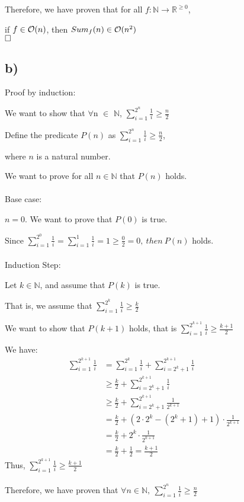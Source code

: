 \documentclass[12pt]{article}
\begin{document}
Therefore, we have proven that for all $f: \mathbb{N} \rightarrow \mathbb{R}^{\geq 0}$,

if  $f \in \mathcal O (n)$, then $Sum_{f}(n) \in \mathcal O (n^2)$ \\

$\hfill\square$ 

\newpage

\subsection*{b)}
\vspace{20pt}
Proof by induction:

We want to show that $\forall$n $\in$ $\mathbb{N}$, $\sum_{i=1}^{2^n} \frac{1}{i} \geq \frac{n}{2}$

Define the predicate $P(n)$ as $\sum_{i=1}^{2^n} \frac{1}{i} \geq \frac{n}{2}$,

where $n$ is a natural number.

We want to prove for all $n \in \mathbb{N}$ that $P(n)$ holds.\\
~\\
Base case:

$n=0$. We want to prove that $P(0)$ is true.

Since $\sum_{i=1}^{2^0} \frac{1}{i} = \sum_{i=1}^{1} \frac{1}{i} = 1 \geq \frac{0}{2} = 0, \ then \ P(n)$ holds.\\
~\\
Induction Step:

Let $k \in \mathbb{N}$, and assume that $P(k)$ is true.

That is, we assume that $\sum_{i=1}^{2^k} \frac{1}{i} \geq \frac{k}{2}$

We want to show that $P(k+1)$ holds, that is $\sum_{i=1}^{2^{k+1}} \frac{1}{i} \geq \frac{k+1}{2}$

We have:
\begin{align*}
\sum_{i=1}^{2^{k+1}} \frac{1}{i} &= \sum_{i=1}^{2^k} \frac{1}{i} + \sum_{i=2^k+1}^{2^{k+1}} \frac{1}{i}\\
&\geq \frac{k}{2} + \sum_{i=2^k+1}^{2^{k+1}} \frac{1}{i}\\
&\geq \frac{k}{2} + \sum_{i=2^k+1}^{2^{k+1}} \frac{1}{2^{k+1}}\\
&= \frac{k}{2} + (2 \cdot 2^k - (2^k+1) +1) \cdot \frac{1}{2^{k+1}}\\
&= \frac{k}{2} + 2^k \cdot \frac{1}{2^{k+1}}\\
&= \frac{k}{2} + \frac{1}{2} = \frac{k+1}{2}
\end{align*}
Thus, $\sum_{i=1}^{2^{k+1}} \frac{1}{i} \geq \frac{k+1}{2}$\\
~\\
Therefore, we have proven that $\forall n \in \mathbb{N}, \  \sum_{i=1}^{2^n} \frac{1}{i} \geq \frac{n}{2}$
\end{document}
